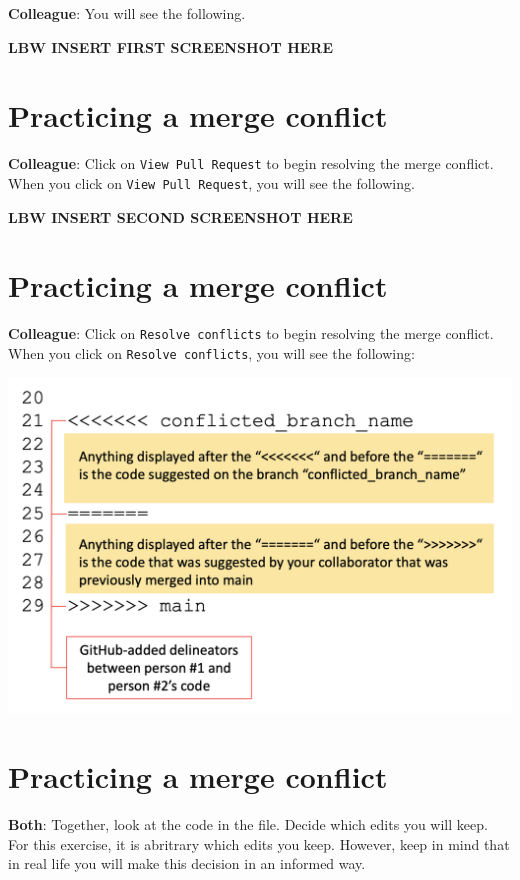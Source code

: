 \documentclass[
]{book}
\begin{document}
\textbf{Colleague}: You will see the following.

\textbf{LBW INSERT FIRST SCREENSHOT HERE}

\hypertarget{practicing-a-merge-conflict-3}{%
\section{Practicing a merge conflict}\label{practicing-a-merge-conflict-3}}

\textbf{Colleague}: Click on \texttt{View\ Pull\ Request} to begin resolving the merge conflict. When you click on \texttt{View\ Pull\ Request}, you will see the following.

\textbf{LBW INSERT SECOND SCREENSHOT HERE}

\hypertarget{practicing-a-merge-conflict-4}{%
\section{Practicing a merge conflict}\label{practicing-a-merge-conflict-4}}

\textbf{Colleague}: Click on \texttt{Resolve\ conflicts} to begin resolving the merge conflict. When you click on \texttt{Resolve\ conflicts}, you will see the following:

\includegraphics[width=0.75\linewidth]{./figures/Example-merge-conflict-github}

\hypertarget{practicing-a-merge-conflict-5}{%
\section{Practicing a merge conflict}\label{practicing-a-merge-conflict-5}}

\textbf{Both}: Together, look at the code in the file. Decide which edits you will keep. For this exercise, it is abritrary which edits you keep. However, keep in mind that in real life you will make this decision in an informed way.
\end{document}
